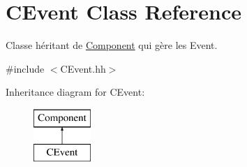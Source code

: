 \hypertarget{class_c_event}{}\section{C\+Event Class Reference}
\label{class_c_event}


Classe héritant de \hyperlink{class_component}{Component} qui gère les Event.  




{\ttfamily \#include $<$C\+Event.\+hh$>$}

Inheritance diagram for C\+Event\+:\begin{figure}[H]
\begin{center}
\leavevmode
\includegraphics[height=2.000000cm]{class_c_event}
\end{center}
\end{figure}
